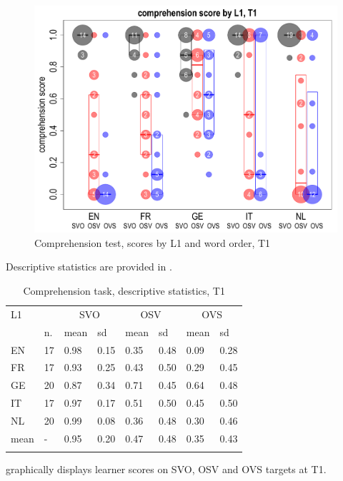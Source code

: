 \begin{figure}
    \includegraphics[width=\textwidth]{figures/05-1.pdf}
    \caption{Comprehension test, scores by L1 and word order, T1}
    \label{fig:05:1}
\end{figure}

Descriptive statistics are provided in .

\begin{table}
    \begin{tabularx}{\textwidth}{XXXXXXXX}
    \lsptoprule
    L1 &  & \multicolumn{2}{c}{SVO} & \multicolumn{2}{c}{OSV} & \multicolumn{2}{c}{OVS}\\
    & n. & mean & sd & mean & sd & mean & sd\\
    \cmidrule(lr){3-4}\cmidrule(lr){5-6}\cmidrule(lr){7-8}
    EN & 17 & 0.98 & 0.15 & 0.35 & 0.48 & 0.09 & 0.28\\
    FR & 17 & 0.93 & 0.25 & 0.43 & 0.50 & 0.29 & 0.45\\
    GE & 20 & 0.87 & 0.34 & 0.71 & 0.45 & 0.64 & 0.48\\
    IT & 17 & 0.97 & 0.17 & 0.51 & 0.50 & 0.45 & 0.50\\
    NL & 20 & 0.99 & 0.08 & 0.36 & 0.48 & 0.30 & 0.46\\
    mean & {}- & 0.95 & 0.20 & 0.47 & 0.48 & 0.35 & 0.43\\
    \lspbottomrule
    \end{tabularx}
    \caption{Comprehension task, descriptive statistics, T1}
    \label{tab:05:1}
\end{table}

 graphically displays learner scores on SVO, OSV and OVS targets at T1.

